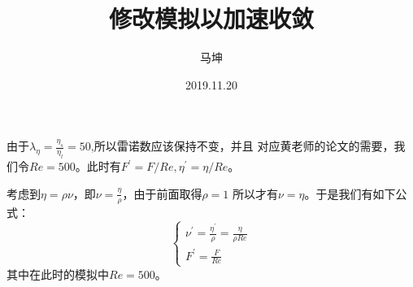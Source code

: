 \documentclass[11pt,UTF8]{ctexart}
\title{修改模拟以加速收敛}
\author{马坤}
\date{2019.11.20}
\begin{document}
    \maketitle
    \par{由于$\lambda_\eta=\frac{\eta_s}{\eta_l}=50$,所以雷诺数应该保持不变，并且
    对应黄老师的论文的需要，我们令$Re=500$。此时有$F^{'}=F/Re,\eta^{'}=\eta / Re$。}
    \par{考虑到$\eta=\rho\nu$，即$\nu=\frac{\eta}{\rho}$，由于前面取得$\rho=1$
    所以才有$\nu=\eta$。于是我们有如下公式：
    $$
    \begin{cases}
            \nu^{'}=\frac{\eta^{'}}{\rho}=\frac{\eta}{\rho Re}\\
            F^{'}=\frac{F}{Re}
    \end{cases}
    $$
    其中在此时的模拟中$Re=500$。}
\end{document}
